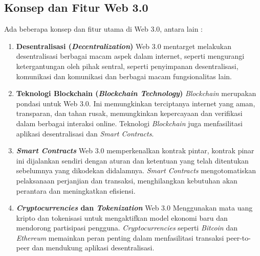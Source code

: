 \documentclass[a4paper]{article}
\begin{document}
\subsection{Konsep dan Fitur Web 3.0}

Ada beberapa konsep dan fitur utama di Web 3.0, antara lain :

\begin{enumerate}
      \item{
                  \raggedleft\textbf{Desentralisasi (\textit{Decentralization})}
                  \linebreak
                  \justifying
                  Web 3.0 mentarget melakukan desentralisasi berbagai macam
                  aspek dalam internet, seperti mengurangi ketergantungan oleh
                  pihak sentral, seperti penyimpanan desentralisasi, komunikasi
                  dan komunikasi dan berbagai macam fungsionalitas lain.
            }

      \item {
            \raggedleft\textbf{Teknologi Blockchain (\textit{Blockchain Technology})}
            \linebreak
            \justifying
            \textit{Blockchain} merupakan pondasi untuk Web 3.0. Ini memungkinkan
            terciptanya internet yang aman, transparan, dan tahan rusak,
            memungkinkan kepercayaan dan verifikasi dalam berbagai interaksi
            online. Teknologi \textit{Blockchain} juga menfasilitasi aplikasi
            desentralisasi dan \textit{Smart Contracts}.
            }

      \item {
            \raggedleft\textbf{\textit{Smart Contracts}}
            \linebreak
            \justifying
            Web 3.0 memperkenalkan kontrak pintar, kontrak pinar ini dijalankan
            sendiri dengan aturan dan ketentuan yang telah ditentukan sebelumnya
            yang dikodekan didalamnya. \textit{Smart Contracts} mengotomatiskan
            pelaksanaan perjanjian dan transaksi, menghilangkan kebutuhan akan
            perantara dan meningkatkan efisiensi.
            }

      \item {
            \raggedleft\textbf{\textit{Cryptocurrencies} dan \textit{Tokenization}}
            \linebreak
            \justifying
            Web 3.0 Menggunakan mata uang kripto dan tokenisasi untuk
            mengaktifkan model ekonomi baru dan mendorong partisipasi pengguna.
            \textit{Cryptocurrencies} seperti \textit{Bitcoin} dan
            \textit{Ethereum} memainkan peran penting dalam menfasilitasi
            transaksi peer-to-peer dan mendukung aplikasi desentralisasi.
            }


\end{enumerate}
\end{document}
